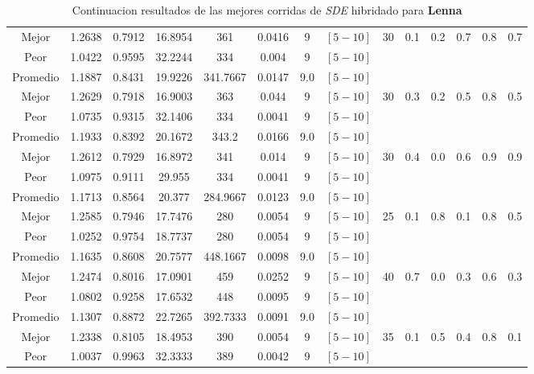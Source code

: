 \begin{table}[h!]
\begin{center}
\begin{tabular}{|c|c|c|c|c|c|c|c|c|c|c|c|c|c|}
            \cline{1-8}
            Mejor & 1.2638 & 0.7912  & 16.8954 & 361 & 0.0416 & 9 & $[5-10]$ & 30 & 0.1 & 0.2 & 0.7 & 0.8 & 0.7\\
            \cline{1-8}
            Peor & 1.0422 & 0.9595  & 32.2244 & 334 & 0.004 & 9 & $[5-10]$ &  &  &  &  &  & \\
        \hline
        \hline
            Promedio  & 1.1887 & 0.8431 & 19.9226 & 341.7667 & 0.0147 & 9.0 & $[5-10]$ &  &  &  &  &  & \\
            \cline{1-8}
            Mejor & 1.2629 & 0.7918  & 16.9003 & 363 & 0.044 & 9 & $[5-10]$ & 30 & 0.3 & 0.2 & 0.5 & 0.8 & 0.5\\
            \cline{1-8}
            Peor & 1.0735 & 0.9315  & 32.1406 & 334 & 0.0041 & 9 & $[5-10]$ &  &  &  &  &  & \\
        \hline
        \hline
            Promedio  & 1.1933 & 0.8392 & 20.1672 & 343.2 & 0.0166 & 9.0 & $[5-10]$ &  &  &  &  &  & \\
            \cline{1-8}
            Mejor & 1.2612 & 0.7929  & 16.8972 & 341 & 0.014 & 9 & $[5-10]$ & 30 & 0.4 & 0.0 & 0.6 & 0.9 & 0.9\\
            \cline{1-8}
            Peor & 1.0975 & 0.9111  & 29.955 & 334 & 0.0041 & 9 & $[5-10]$ &  &  &  &  &  & \\
        \hline
        \hline
            Promedio  & 1.1713 & 0.8564 & 20.377 & 284.9667 & 0.0123 & 9.0 & $[5-10]$ &  &  &  &  &  & \\
            \cline{1-8}
            Mejor & 1.2585 & 0.7946  & 17.7476 & 280 & 0.0054 & 9 & $[5-10]$ & 25 & 0.1 & 0.8 & 0.1 & 0.8 & 0.5\\
            \cline{1-8}
            Peor & 1.0252 & 0.9754  & 18.7737 & 280 & 0.0054 & 9 & $[5-10]$ &  &  &  &  &  & \\
        \hline
        \hline
            Promedio  & 1.1635 & 0.8608 & 20.7577 & 448.1667 & 0.0098 & 9.0 & $[5-10]$ &  &  &  &  &  & \\
            \cline{1-8}
            Mejor & 1.2474 & 0.8016  & 17.0901 & 459 & 0.0252 & 9 & $[5-10]$ & 40 & 0.7 & 0.0 & 0.3 & 0.6 & 0.3\\
            \cline{1-8}
            Peor & 1.0802 & 0.9258  & 17.6532 & 448 & 0.0095 & 9 & $[5-10]$ &  &  &  &  &  & \\
        \hline
        \hline
            Promedio  & 1.1307 & 0.8872 & 22.7265 & 392.7333 & 0.0091 & 9.0 & $[5-10]$ &  &  &  &  &  & \\
            \cline{1-8}
            Mejor & 1.2338 & 0.8105  & 18.4953 & 390 & 0.0054 & 9 & $[5-10]$ & 35 & 0.1 & 0.5 & 0.4 & 0.8 & 0.1\\
            \cline{1-8}
            Peor & 1.0037 & 0.9963  & 32.3333 & 389 & 0.0042 & 9 & $[5-10]$ &  &  &  &  &  & \\
        \hline
        \end{tabular}
        \caption{Continuacion resultados de las mejores corridas de \emph{SDE} hibridado para {\bf Lenna}}
        \label{tb:tablesdehibimgc}
    \end{center}
\end{table}
